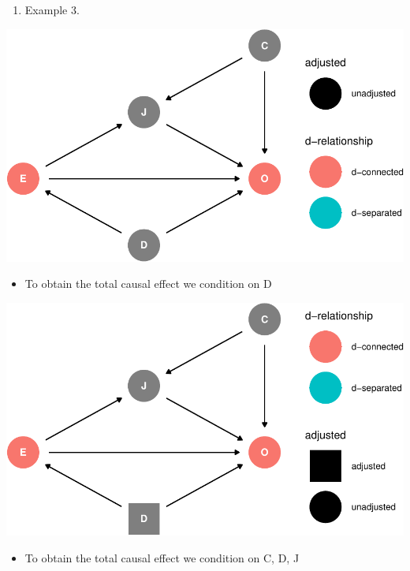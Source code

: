 \documentclass[
]{article}
\providecommand{\tightlist}{%
  \setlength{\itemsep}{0pt}\setlength{\parskip}{0pt}}
\begin{document}
\begin{enumerate}
\def\labelenumi{\arabic{enumi}.}
\setcounter{enumi}{2}
\tightlist
\item
  Example 3.
\end{enumerate}

\includegraphics{index_files/figure-latex/dag1.5 ex-1.pdf}

\begin{itemize}
\tightlist
\item
  To obtain the total causal effect we condition on D
\end{itemize}

\includegraphics{index_files/figure-latex/adjust D ex-1.pdf}

\begin{itemize}
\tightlist
\item
  To obtain the total causal effect we condition on C, D, J
\end{itemize}
\end{document}
